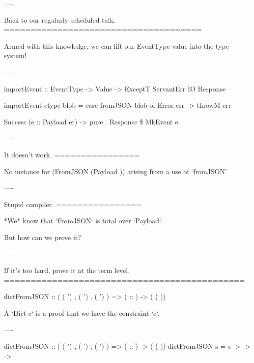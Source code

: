 ----

Back to our regularly scheduled talk.
=====================================

Armed with this knowledge, we can lift our EventType value into the type system!

----

\begin{raw}
  importEvent :: EventType
              -> Value
              -> ExceptT ServantErr IO Response

  importEvent etype blob =
      case fromJSON blob of
        Error err ->
          throwM err

        Success (e :: Payload et) ->
          pure . Response \$ MkEvent e
\end{raw}

----

It doesn't work.
================

\begin{error}
  No instance for (FromJSON (Payload ))
    arising from a use of `fromJSON'
\end{error}

----

Stupid compiler.
================

*We* know that `FromJSON` is total over `Payload`.

But how can we prove it?

----

If it's too hard, prove it at the term level.
=============================================

\begin{custom}
  dictFromJSON :: (  ( ')
                  ,  ( ')
                  ,  ( ')
                  )
               =>  ( :: )
               ->  ( ( ))
\end{custom}

A `Dict c` is a proof that we have the constraint `c`.

----

\begin{custom}
  dictFromJSON :: (  ( ')
                  ,  ( ')
                  ,  ( ')
                  )
               =>  ( :: )
               ->  ( ( ))
  dictFromJSON s =  s 
      -> 
         -> 
     -> 
\end{custom}

